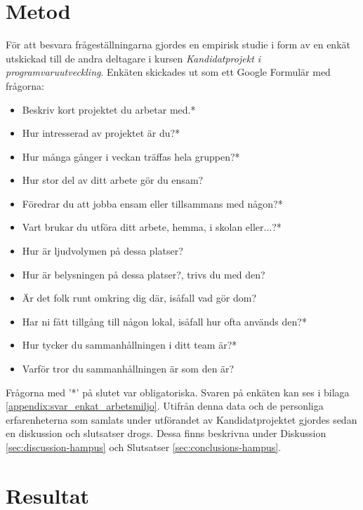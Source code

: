 \section{Metod}
\label{sec:method-hampus}

För att besvara frågeställningarna gjordes en empirisk studie i form av en enkät utskickad till de andra deltagare i kursen \textit{Kandidatprojekt i programvaruutveckling}. Enkäten skickades ut som ett Google Formulär\cite{GForms} med frågorna:
\begin{itemize}
\item Beskriv kort projektet du arbetar med.*
\item Hur intresserad av projektet är du?*
\item Hur många gånger i veckan träffas hela gruppen?*
\item Hur stor del av ditt arbete gör du ensam?
\item Föredrar du att jobba ensam eller tillsammans med någon?*
\item Vart brukar du utföra ditt arbete, hemma, i skolan eller...?*
\item Hur är ljudvolymen på dessa platser?
\item Hur är belysningen på dessa platser?, trivs du med den?
\item Är det folk runt omkring dig där, isåfall vad gör dom?
\item Har ni fått tillgång till någon lokal, isåfall hur ofta används den?*
\item Hur tycker du sammanhållningen i ditt team är?*
\item Varför tror du sammanhållningen är som den är?
\end{itemize}
Frågorna med '*' på slutet var obligatoriska. Svaren på enkäten kan ses i bilaga \ref{appendix:svar_enkat_arbetsmiljo}. Utifrån denna data och de personliga erfarenheterna som samlats under utförandet av Kandidatprojektet gjordes sedan en diskussion och slutsatser drogs. Dessa finns beskrivna under Diskussion \ref{sec:discussion-hampus} och Slutsatser \ref{sec:conclusions-hampus}. 

\section{Resultat}
\label{sec:results-hampus}

